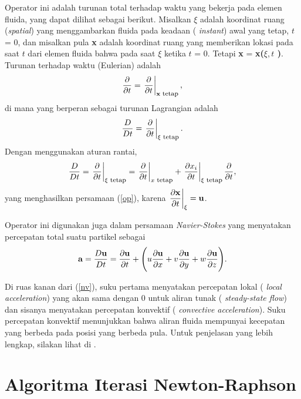 \documentclass[12pt,a4paper]{report}
\begin{document}
Operator ini adalah turunan total terhadap waktu yang bekerja pada elemen
fluida, yang dapat dilihat sebagai berikut. Misalkan $\xi $ adalah koordinat
ruang (\textit{spatial}) yang menggambarkan fluida pada keadaan (\textit{%
instant}) awal yang tetap, $t$ = 0, dan misalkan pula \textbf{x} adalah
koordinat ruang yang memberikan lokasi pada saat $t$ dari elemen fluida
bahwa pada saat $\xi $ ketika $t$ = 0. Tetapi \textbf{x} = \textbf{x($\xi ,t$%
)}. Turunan terhadap waktu (Eulerian) adalah
\begin{equation}
\frac{\partial}{\partial t} = \left. \frac{\partial}{\partial t} \right|_{%
\mathbf{x} \hskip 0.1cm {\textmd{{\footnotesize tetap}}}},
\end{equation}
di mana yang berperan sebagai turunan Lagrangian adalah
\begin{equation}
\frac{D}{Dt} = \left.\frac{\partial}{\partial t}\right|_{\xi \hskip 0.1cm {%
\textmd{{\footnotesize tetap}}}}.
\end{equation}
Dengan menggunakan aturan rantai,
\[
\frac{D}{Dt} = \left.\frac{\partial}{\partial t}\right|_{\xi \hskip 0.1cm {%
\textmd{{\footnotesize tetap}}}} = \left.\frac{\partial}{\partial t}\right|_{x %
\hskip 0.1cm {\textmd{{\footnotesize tetap}}}} + \left.\frac{\partial x_i}{%
\partial t}\right|_{\xi \hskip 0.1cm {\textmd{{\footnotesize tetap}}}} \frac{%
\partial}{\partial t},
\]
yang menghasilkan persamaan (\ref{op}), karena $\displaystyle\left. \frac{%
\partial\mathbf{x}}{\partial t}\right|_{\xi} = \mathbf{u }$.

Operator ini digunakan juga dalam persamaan \textit{Navier-Stokes}
yang menyatakan percepatan total suatu partikel sebagai
\begin{equation}
\mathbf{a}=\frac{D\mathbf{u}}{Dt}=\frac{\partial \mathbf{u}}{\partial t}+%
\Bigg(u\frac{\partial \mathbf{u}}{\partial x}+v\frac{\partial \mathbf{u}}{%
\partial y}+w\frac{\partial \mathbf{u}}{\partial z}\Bigg).  \label{nv}
\end{equation}

Di ruas kanan dari (\ref{nv}), suku pertama menyatakan percepatan lokal (%
\textit{local acceleration}) yang akan sama dengan 0 untuk aliran tunak (%
\textit{steady-state flow}) dan sisanya menyatakan percepatan konvektif (%
\textit{convective acceleration}). Suku percepatan konvektif menunjukkan
bahwa aliran fluida mempunyai kecepatan yang berbeda pada posisi yang
berbeda pula. Untuk penjelasan yang lebih lengkap, silakan lihat di \cite
{fac,hwf}.

\chapter{Algoritma Iterasi Newton-Raphson}
\end{document}
